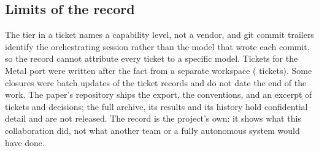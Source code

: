 \subsection{Limits of the record}

The tier in a ticket names a capability level, not a vendor, and git commit
trailers identify the orchestrating session rather than the model that wrote
each commit, so the record cannot attribute every ticket to a specific model.
Tickets for the Metal port were written after the fact from a separate
workspace (\RetroactiveTicketCount{} tickets). Some closures were batch updates
of the ticket records and do not date the end of the work. The paper's repository
ships the export, the conventions, and an excerpt of tickets and decisions; the
full archive, its results and its history hold confidential detail and are not
released. The record is the project's own: it shows what this collaboration
did, not what another team or a fully autonomous system would have done.
